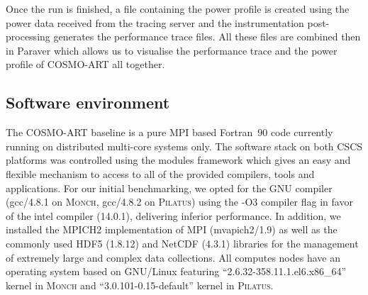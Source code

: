 Once  the run  is finished,  a file  containing the  power  profile is
created using the power data  received from the tracing server and the
instrumentation post-processing generates the performance trace files.
All  these files  are  combined then  in  Paraver which  allows us  to
visualise the performance trace and the power profile of COSMO-ART all
together.




\subsection{Software environment}
\label{subsec:3.2}

The COSMO-ART baseline  is a pure MPI based  Fortran~90 code currently
running on distributed multi-core systems only.  The software stack on
both CSCS  platforms was controlled using the  modules framework which
gives an easy and flexible mechanism  to access to all of the provided
compilers, tools  and applications.  For our  initial benchmarking, we
opted for the GNU  compiler (gcc/4.8.1 on \textsc{Monch}, gcc/4.8.2 on
\textsc{Pilatus}) using  the -O3 compiler  flag in favor of  the intel
compiler (14.0.1),  delivering inferior performance.   In addition, we
installed the  MPICH2 implementation of MPI (mvapich2/1.9)  as well as
the commonly used  HDF5 (1.8.12) and NetCDF (4.3.1)  libraries for the
management  of  extremely large  and  complex  data collections.   All
computes nodes  have an operating system based  on GNU/Linux featuring
``2.6.32-358.11.1.el6.x86\_64''    kernel   in    \textsc{Monch}   and
``3.0.101-0.15-default'' kernel in \textsc{Pilatus}.

